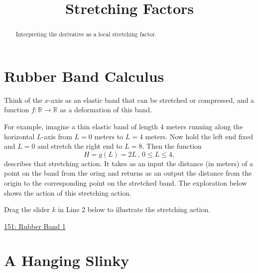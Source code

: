 \documentclass{ximera}
\title{Stretching Factors}
\begin{document}
\begin{abstract}
Interpreting the derivative as a local stretching factor.
\end{abstract}
\maketitle

\section{Rubber Band Calculus}

Think of the $x$-axis as an elastic band that can be stretched or compressed, and a function $f : \mathbb{R}\to\mathbb{R}$ as a deformation of this band. %

For example, imagine a thin elastic band of length $4$ meters running along the horizontal $L$-axis from $L=0$ meters to $L=4$ meters.  Now hold the left end fixed and $L=0$ and stretch the right end to $L=8$. Then the function
\[
      H = g(L) = 2L \, , \, 0\leq L \leq 4 ,
\]
describes that stretching action. It takes as an input the distance (in meters) of a point on the band from the oring and returns as an output the distance from the origin to the corresponding point on the stretched band. The exploration below shows the action of this stretching action.

\begin{exploration} \label{Ex:98f3rgafgbb}
Drag the slider $k$ in Line 2 below to illustrate the stretching action.

\begin{onlineOnly}
    \begin{center}
\end{center}
\end{onlineOnly}

\href{https://www.desmos.com/calculator/qejivz36ui}{151: Rubber Band 1}

\end{exploration}


\section{A Hanging Slinky}
\end{document}
